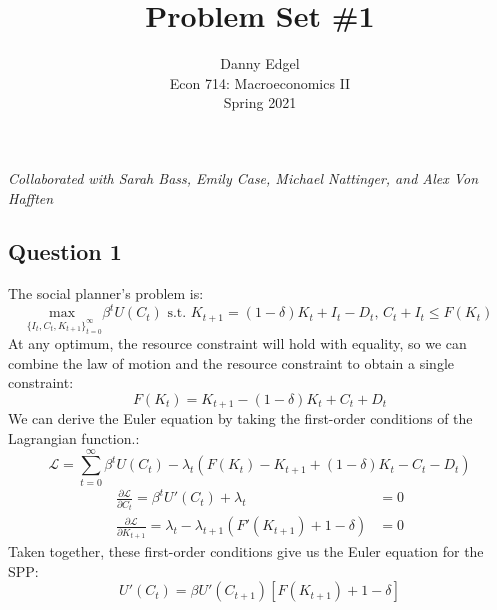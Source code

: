 \documentclass{article}
\newcommand{\usmax}[1]{\underset{#1}{\text{max }}}
\renewcommand{\L}{\mathcal{L}}
\begin{document}
\title{	Problem Set \#1 }
\author{ 	Danny Edgel 					\\ 
			Econ 714: Macroeconomics II		\\
			Spring 2021						\\
		}
\maketitle\thispagestyle{empty}


\noindent\textit{Collaborated with Sarah Bass, Emily Case, Michael Nattinger, and Alex Von Hafften}


\subsection*{Question 1}

The social planner's problem is:
\[
	\usmax{\{I_t,C_t,K_{t+1}\}_{t=0}^\infty}\beta^tU(C_t)\text{ s.t. }K_{t+1} = (1-\delta)K_t + I_t - D_t\text{, } C_t + I_t\leq F(K_t)
\]
At any optimum, the resource constraint will hold with equality, so we can combine the law of motion and the resource constraint to obtain a single constraint:
\[
	F(K_t) = K_{t+1} - (1-\delta)K_t + C_t + D_t 
\]
We can derive the Euler equation by taking the first-order conditions of the Lagrangian function.:
\[
	\L = \sum_{t=0}^\infty \beta^tU(C_t) - \lambda_t\left(F(K_t) - K_{t+1} + (1-\delta)K_t - C_t - D_t \right)
\]
\begin{align*}
	\frac{\partial \L}{\partial C_t} 		= \beta^tU'(C_t)+\lambda_t 										&= 0	\\
	\frac{\partial \L}{\partial K_{t+1}}	= \lambda_t - \lambda_{t+1}\left(F'(K_{t+1}) + 1-\delta\right) 	&= 0	
\end{align*}
Taken together, these first-order conditions give us the Euler equation for the SPP:
\[
	U'(C_t) = \beta U'(C_{t+1})\left[F(K_{t+1})+1-\delta\right]
\]


\pagebreak
\end{document}
